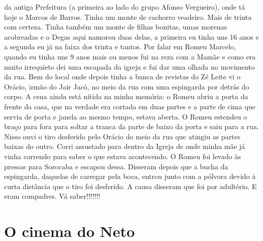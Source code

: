 \documentclass[12pt,brazil,]{book}
\begin{document}
da antiga Prefeitura (a primeira ao lado do grupo Afonso Vergueiro),
onde tá hoje o Marcos de Barros. Tinha um monte de cachorro veadeiro.
Mais de trinta com certeza. Tinha também um monte de filhas bonitas,
umas morenas acobreadas e o Degas aqui namorou duas delas, a primeira eu
tinha uns 16 anos e a segunda eu já na faixa dos trinta e tantos. Por
falar em Romeu Marcelo, quando eu tinha uns 9 anos mais ou menos fui na
reza com a Mamãe e como era muito irrequieto dei uma escapada da igreja
e fui dar uma olhada no movimento da rua. Bem do local onde depois tinha
a banca de revistas do Zé Leite vi o Orácio, irmão do Jair Jacó, no meio
da rua com uma espingarda por detrás do corpo. A cena ainda está nítida
na minha memória: o Romeu abriu a porta da frente da casa, que na
verdade era cortada em duas partes e a parte de cima que servia de porta
e janela ao mesmo tempo, estava aberta. O Romeu estendeu o braço para
fora para soltar a tranca da parte de baixo da porta e saiu para a rua.
Nisso ouvi o tiro desferido pelo Orácio do meio da rua que atingiu as
partes baixas do outro. Corri assustado para dentro da Igreja de onde
minha mãe já vinha correndo para saber o que estava acontecendo. O Romeu
foi levado às pressas para Sorocaba e escapou dessa. Disseram depois que
a bucha da espingarda, daquelas de carregar pela boca, entrou junto com
a pólvora devido à curta distância que o tiro foi desferido. A causa
disseram que foi por adultério. E eram compadres. Vá saber!!!!!!!

\section{O cinema do Neto}\label{o-cinema-do-neto}
\end{document}
